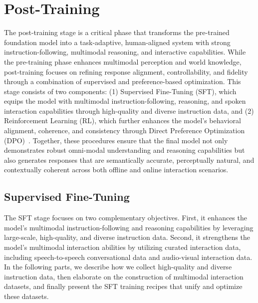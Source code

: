 \documentclass{article}
\begin{document}
\section{Post-Training} %
\label{sec4:post-train}

The post-training stage is a critical phase that transforms the pre-trained foundation model into a task-adaptive, human-aligned system with strong instruction-following, multimodal reasoning, and interactive capabilities. While the pre-training phase enhances multimodal perception and world knowledge, post-training focuses on refining response alignment, controllability, and fidelity through a combination of supervised and preference-based optimization.
This stage consists of two components: (1) Supervised Fine-Tuning (SFT), which equips the model with multimodal instruction-following, reasoning, and spoken interaction capabilities through high-quality and diverse instruction data, and (2) Reinforcement Learning (RL), which further enhances the model’s behavioral alignment, coherence, and consistency through Direct Preference Optimization (DPO)~\citep{rafailov2023direct}.
Together, these procedures ensure that the final model not only demonstrates robust omni-modal understanding and reasoning capabilities but also generates responses that are semantically accurate, perceptually natural, and contextually coherent across both offline and online interaction scenarios.

\subsection{Supervised Fine-Tuning}


The SFT stage focuses on two complementary objectives. First, it enhances the model’s multimodal instruction-following and reasoning capabilities by leveraging large-scale, high-quality, and diverse instruction data. Second, it strengthens the model’s multimodal interaction abilities by utilizing curated interaction data, including speech-to-speech conversational data and audio-visual interaction data.
In the following parts, we describe how we collect high-quality and diverse instruction data, then elaborate on the construction of multimodal interaction datasets, and finally present the SFT training recipes that unify and optimize these datasets.
\end{document}
